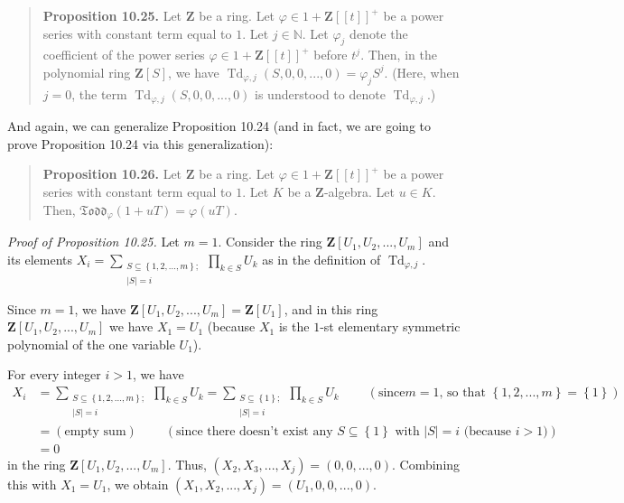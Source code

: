 \documentclass[numbers=enddot,12pt,final,onecolumn,notitlepage]{scrartcl}%
\begin{document}
\begin{quote}
\textbf{Proposition 10.25.} Let $\mathbf{Z}$ be a ring. Let $\varphi
\in1+\mathbf{Z}\left[  \left[  t\right]  \right]  ^{+}$ be a power series with
constant term equal to $1$. Let $j\in\mathbb{N}$. Let $\varphi_{j}$ denote the
coefficient of the power series $\varphi\in1+\mathbf{Z}\left[  \left[
t\right]  \right]  ^{+}$ before $t^{j}$. Then, in the polynomial ring
$\mathbf{Z}\left[  S\right]  $, we have $\operatorname*{Td}\nolimits_{\varphi
,j}\left(  S,0,0,...,0\right)  =\varphi_{j}S^{j}$. (Here, when $j=0$, the term
$\operatorname*{Td}\nolimits_{\varphi,j}\left(  S,0,0,...,0\right)  $ is
understood to denote $\operatorname*{Td}\nolimits_{\varphi,j}$.)
\end{quote}

And again, we can generalize Proposition 10.24 (and in fact, we are going to
prove Proposition 10.24 via this generalization):

\begin{quote}
\textbf{Proposition 10.26.} Let $\mathbf{Z}$ be a ring. Let $\varphi
\in1+\mathbf{Z}\left[  \left[  t\right]  \right]  ^{+}$ be a power series with
constant term equal to $1$. Let $K$ be a $\mathbf{Z}$-algebra. Let $u\in K$.
Then, $\mathfrak{Todd}_{\varphi}\left(  1+uT\right)  =\varphi\left(
uT\right)  $.
\end{quote}

\textit{Proof of Proposition 10.25.} Let $m=1$. Consider the ring
$\mathbf{Z}\left[  U_{1},U_{2},...,U_{m}\right]  $ and its elements
$X_{i}=\sum\limits_{\substack{S\subseteq\left\{  1,2,...,m\right\}
;\\\left\vert S\right\vert =i}}\prod\limits_{k\in S}U_{k}$ as in the
definition of $\operatorname*{Td}\nolimits_{\varphi,j}$.

Since $m=1$, we have $\mathbf{Z}\left[  U_{1},U_{2},...,U_{m}\right]
=\mathbf{Z}\left[  U_{1}\right]  $, and in this ring $\mathbf{Z}\left[
U_{1},U_{2},...,U_{m}\right]  $ we have $X_{1}=U_{1}$ (because $X_{1}$ is the
$1$-st elementary symmetric polynomial of the one variable $U_{1}$).

For every integer $i>1$, we have%
\begin{align*}
X_{i}  &  =\sum\limits_{\substack{S\subseteq\left\{  1,2,...,m\right\}
;\\\left\vert S\right\vert =i}}\prod\limits_{k\in S}U_{k}=\sum
\limits_{\substack{S\subseteq\left\{  1\right\}  ;\\\left\vert S\right\vert
=i}}\prod\limits_{k\in S}U_{k}\ \ \ \ \ \ \ \ \ \ \left(  \text{since
}m=1\text{, so that }\left\{  1,2,...,m\right\}  =\left\{  1\right\}  \right)
\\
&  =\left(  \text{empty sum}\right)  \ \ \ \ \ \ \ \ \ \ \left(  \text{since
there doesn't exist any }S\subseteq\left\{  1\right\}  \text{ with }\left\vert
S\right\vert =i\text{ (because }i>1\text{)}\right) \\
&  =0
\end{align*}
in the ring $\mathbf{Z}\left[  U_{1},U_{2},...,U_{m}\right]  $. Thus, $\left(
X_{2},X_{3},...,X_{j}\right)  =\left(  0,0,...,0\right)  $. Combining this
with $X_{1}=U_{1}$, we obtain $\left(  X_{1},X_{2},...,X_{j}\right)  =\left(
U_{1},0,0,...,0\right)  $.
\end{document}
